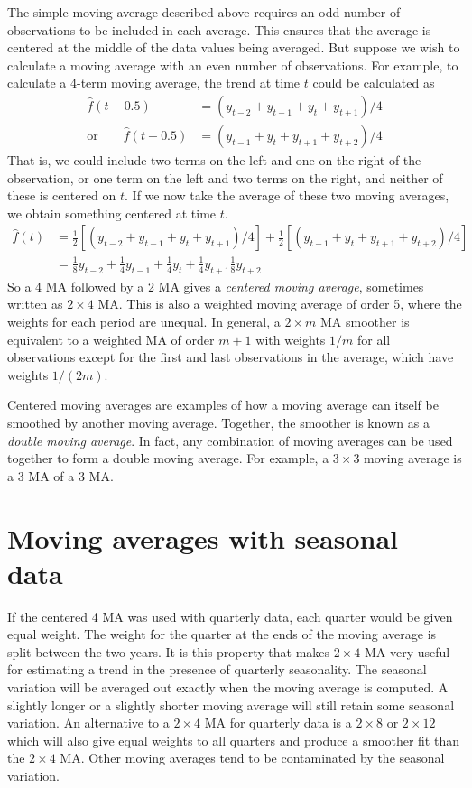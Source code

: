 \documentclass[a4paper,10pt]{article}
\newcommand{\smfrac}[2]{{\scriptstyle\frac{#1}{#2}}}
\begin{document}
The simple moving average described above requires an odd number of observations to be included in each average. This ensures that the average is centered at the middle of the data values being averaged. But suppose we wish to calculate a moving average with an even number of observations. For example, to calculate a 4-term moving average, the trend at time $t$ could be calculated as
\begin{align*}
	\hat{f}(t-0.5) & = (y_{t-2} + y_{t-1} + y_t + y_{t+1})/4 \\
	\text{or}\qquad\hat{f}(t+0.5) & = (y_{t-1} + y_{t} + y_{t+1} + y_{t+2})/4
\end{align*}
That is, we could include two terms on the left and one on the right of the observation, or one term on the left and two terms on the right, and neither of these is centered on $t$. If we now take the average of these two moving averages, we obtain something centered at time $t$.
\begin{align*}
	\hat{f}(t) & = \smfrac12\left[ (y_{t-2} + y_{t-1} + y_t + y_{t+1})/4\right] + \smfrac12\left[(y_{t-1} + y_{t} + y_{t+1} + y_{t+2})/4\right] \\
	 & = \smfrac18 y_{t-2} + \smfrac14 y_{t-1} + \smfrac14 y_t + \smfrac14 y_{t+1} \smfrac18 y_{t+2}
\end{align*}
So a 4 MA followed by a 2 MA gives a \textit{centered moving average}, sometimes written as $2\times4$ MA. This is also a weighted moving average of order 5, where the weights for each period are unequal. In general, a $2\times m$ MA smoother is equivalent to a weighted MA of order $m+1$ with weights $1/m$ for all observations except for the first and last observations in the average, which have weights $1/(2m)$.

Centered moving averages are examples of how a moving average can itself be smoothed by another moving average. Together, the smoother is known as a \emph{double moving average}. In fact, any combination of moving averages can be used together to form a double moving average. For example, a $3\times3$ moving average is a 3 MA of a 3 MA.

\section{Moving averages with seasonal data}

If the centered 4 MA was used with quarterly data, each quarter would be given equal weight. The weight for the quarter at the ends of the moving average is split between the two years. It is this property that makes $2\times4$ MA very useful for estimating a trend in the presence of quarterly seasonality. The seasonal variation will be averaged out exactly when the moving average is computed. A slightly longer or a slightly shorter moving average will still retain some seasonal variation. An alternative to a $2\times4$ MA for quarterly data is a $2\times8$ or $2\times12$ which will also give equal weights to all quarters and produce a smoother fit than the $2\times4$ MA.
Other moving averages tend to be contaminated by the seasonal variation.
\end{document}
